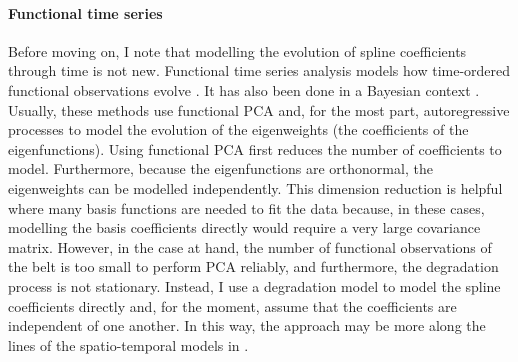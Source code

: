 \paragraph{Functional time series}
Before moving on, I note that modelling the evolution of spline coefficients through time is not new. Functional time series analysis models how time-ordered functional observations evolve \citep{hormann_2012}. It has also been done in a Bayesian context \citep{kowal_2017}. Usually, these methods use functional PCA \citep[p. 16]{ramsay_2009} and, for the most part, autoregressive processes to model the evolution of the eigenweights (the coefficients of the eigenfunctions). Using functional PCA first reduces the number of coefficients to model. Furthermore, because the eigenfunctions are orthonormal, the eigenweights can be modelled independently. This dimension reduction is helpful where many basis functions are needed to fit the data because, in these cases, modelling the basis coefficients directly would require a very large covariance matrix. However, in the case at hand, the number of functional observations of the belt is too small to perform PCA reliably, and furthermore, the degradation process is not stationary. Instead, I use a degradation model to model the spline coefficients directly and, for the moment, assume that the coefficients are independent of one another. In this way, the approach may be more along the lines of the spatio-temporal models in \citet[p. 218-224]{wikle_2019}.

